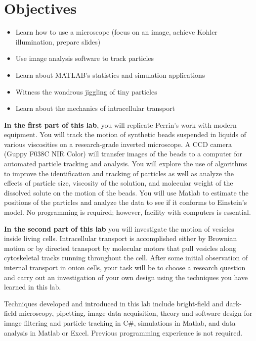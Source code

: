 \documentclass{../lab}
\begin{document}
\section{Objectives}

\begin{itemize}
    \item Learn how to use a microscope (focus on an image, achieve Kohler illumination, prepare slides)

    \item Use image analysis software to track particles

    \item Learn about MATLAB's statistics and simulation applications

    \item Witness the wondrous jiggling of tiny particles

    \item Learn about the mechanics of intracellular transport
\end{itemize}

\textbf{In the first part of this lab}, you will replicate Perrin's work with modern equipment. You will track the motion of synthetic beads suspended in liquids of various viscosities on a research-grade inverted microscope. A CCD camera (Guppy F038C NIR Color) will transfer images of the beads to a computer for automated particle tracking and analysis. You will explore the use of algorithms to improve the identification and tracking of particles as well as analyze the effects of particle size, viscosity of the solution, and molecular weight of the dissolved solute on the motion of the beads. You will use Matlab to estimate the positions of the particles and analyze the data to see if it conforms to Einstein's model. No programming is required; however, facility with computers is essential.

\textbf{In the second part of this lab} you will investigate the motion of vesicles inside living cells. Intracellular transport is accomplished either by Brownian motion or by directed transport by molecular motors that pull vesicles along cytoskeletal tracks running throughout the cell. After some initial observation of internal transport in onion cells, your task will be to choose a research question and carry out an investigation of your own design using the techniques you have learned in this lab.

Techniques developed and introduced in this lab include bright-field and dark-field microscopy, pipetting, image data acquisition, theory and software design for image filtering and particle tracking in C\#, simulations in Matlab, and data analysis in Matlab or Excel. Previous programming experience is not required.
\end{document}
